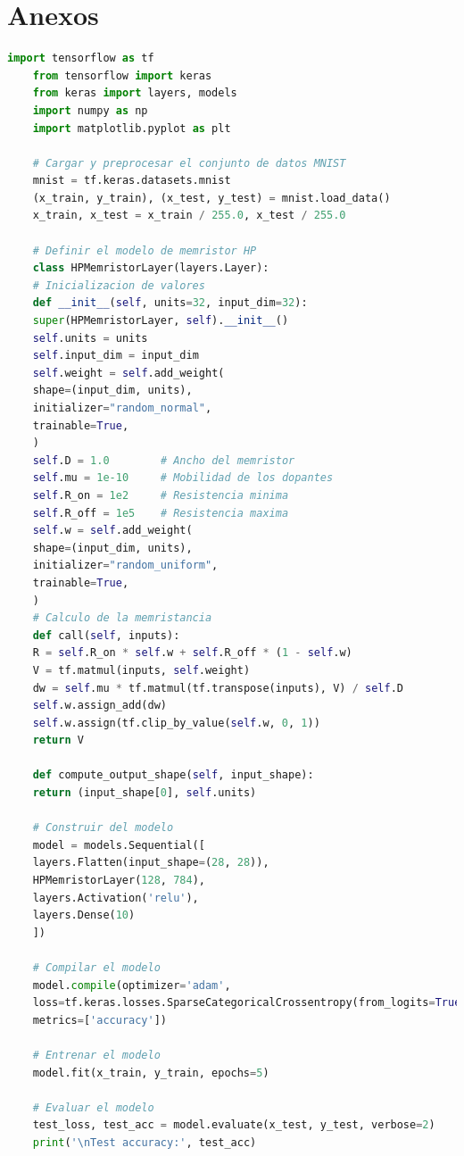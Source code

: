 \documentclass[conference]{IEEEtran}
\begin{document}



\clearpage
\section{Anexos}

\begin{lstlisting}[language=Python, caption=Código para el entrenamiento y clasificación del conjunto de datos MNIST de una red neuronal artificial con el modelo de memristor de HP incorporado.]
	import tensorflow as tf
	from tensorflow import keras
	from keras import layers, models
	import numpy as np
	import matplotlib.pyplot as plt
	
	# Cargar y preprocesar el conjunto de datos MNIST
	mnist = tf.keras.datasets.mnist
	(x_train, y_train), (x_test, y_test) = mnist.load_data()
	x_train, x_test = x_train / 255.0, x_test / 255.0
	
	# Definir el modelo de memristor HP
	class HPMemristorLayer(layers.Layer):
	# Inicializacion de valores
	def __init__(self, units=32, input_dim=32):
	super(HPMemristorLayer, self).__init__()
	self.units = units
	self.input_dim = input_dim
	self.weight = self.add_weight(
	shape=(input_dim, units),
	initializer="random_normal",
	trainable=True,
	)
	self.D = 1.0        # Ancho del memristor
	self.mu = 1e-10     # Mobilidad de los dopantes
	self.R_on = 1e2     # Resistencia minima
	self.R_off = 1e5    # Resistencia maxima
	self.w = self.add_weight(
	shape=(input_dim, units),
	initializer="random_uniform",
	trainable=True,
	)
	# Calculo de la memristancia
	def call(self, inputs):
	R = self.R_on * self.w + self.R_off * (1 - self.w)
	V = tf.matmul(inputs, self.weight)
	dw = self.mu * tf.matmul(tf.transpose(inputs), V) / self.D
	self.w.assign_add(dw)
	self.w.assign(tf.clip_by_value(self.w, 0, 1))
	return V
	
	def compute_output_shape(self, input_shape):
	return (input_shape[0], self.units)
	
	# Construir del modelo
	model = models.Sequential([
	layers.Flatten(input_shape=(28, 28)),
	HPMemristorLayer(128, 784),
	layers.Activation('relu'),
	layers.Dense(10)
	])
	
	# Compilar el modelo
	model.compile(optimizer='adam',
	loss=tf.keras.losses.SparseCategoricalCrossentropy(from_logits=True),
	metrics=['accuracy'])
	
	# Entrenar el modelo
	model.fit(x_train, y_train, epochs=5)
	
	# Evaluar el modelo
	test_loss, test_acc = model.evaluate(x_test, y_test, verbose=2)
	print('\nTest accuracy:', test_acc)
	

\end{lstlisting}
\end{document}
